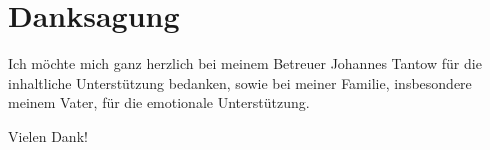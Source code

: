 \section*{Danksagung}
Ich möchte mich ganz herzlich bei meinem Betreuer Johannes Tantow für die inhaltliche Unterstützung bedanken,
sowie bei meiner Familie, insbesondere meinem Vater, für die emotionale Unterstützung.

Vielen Dank!
